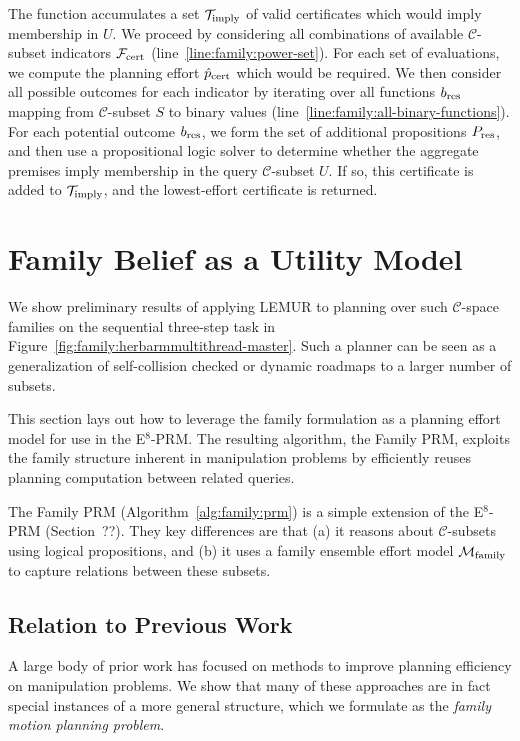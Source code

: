 The function accumulates a set $\mathcal{T}_{\mbox{\scriptsize imply}}$ of
valid certificates which would imply membership in $U$.
We proceed by considering all combinations of
available $\mathcal{C}$-subset indicators
$\mathcal{F}_{\mbox{\scriptsize cert}}$ (line~\ref{line:family:power-set}).
For each set of evaluations,
we compute the planning effort ${\hat p}_{\mbox{\scriptsize cert}}$
which would be required.
We then consider all possible outcomes for each indicator
by iterating over all functions $b_{\mbox{\scriptsize res}}$ mapping
from $\mathcal{C}$-subset $S$ to binary values
(line~\ref{line:family:all-binary-functions}).
For each potential outcome $b_{\mbox{\scriptsize res}}$,
we form the set of additional propositions $P_{\mbox{\scriptsize res}}$,
and then use a propositional logic solver to determine whether
the aggregate premises imply membership
in the query $\mathcal{C}$-subset $U$.
If so, this certificate is added to $\mathcal{T}_{\mbox{\scriptsize imply}}$,
and the lowest-effort certificate is returned.

\section{Family Belief as a Utility Model}
\label{sec:family:as-utility}

We show preliminary results of applying LEMUR to planning over
such $\mathcal{C}$-space families on the sequential
three-step task in
Figure~\ref{fig:family:herbarmmultithread-master}.
Such a planner can be seen as a generalization of self-collision checked
\citep{leven2002changing} or dynamic \citep{jaillet2004dynamicprm}
roadmaps to a larger number of subsets.

This section lays out how to leverage the family formulation
as a planning effort model
for use in the E$^8$-PRM.
The resulting algorithm,
the Family PRM,
exploits the family structure inherent in manipulation problems
by efficiently reuses planning computation between related queries.

The Family PRM (Algorithm~\ref{alg:family:prm}) is a simple
extension of the \mbox{E$^8$-PRM}
(Section~??).
They key differences are that
(a) it reasons about $\mathcal{C}$-subsets
using logical propositions,
and (b) it uses a family ensemble effort model
$\mathcal{M}_{\mbox{\scriptsize family}}$ to capture relations
between these subsets.

\subsection{Relation to Previous Work}

A large body of prior work has focused on methods to
improve planning efficiency on manipulation problems.
We show that many of these approaches are
in fact special instances of a more general structure,
which we formulate as the \emph{family motion planning problem}.

